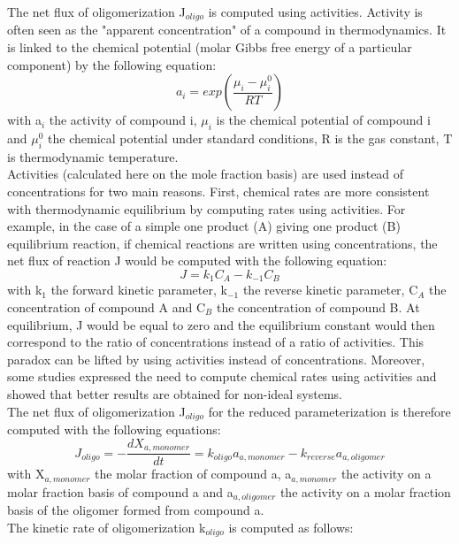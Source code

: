 \documentclass[a4paper,11pt]{article}
\begin{document}
\indent The net flux of oligomerization J$_{oligo}$ is computed using activities. Activity is often seen as the "apparent concentration" of a compound in thermodynamics. It is linked to the chemical potential (molar Gibbs free energy of a particular component) by the following equation:
\begin{equation}
a_i=exp(\frac{\mu_i-\mu_i^0}{RT})
\label{activity}
\end{equation}
with a$_i$ the activity of compound i, $\mu_i$ is the chemical potential of compound i and $\mu_i^0$ the chemical potential under standard conditions, R is the gas constant, T is thermodynamic temperature.\\
Activities (calculated here on the mole fraction basis) are used instead of concentrations for two main reasons. 
First, chemical rates are more consistent with thermodynamic equilibrium by computing rates using activities. For example, in the case of a simple one product (A) giving one product (B) equilibrium reaction, if chemical reactions are written using concentrations, the net flux of reaction J would be computed with the following equation:
\begin{equation}
J=k_{1} C_{A}-k_{-1}C_{B}
\label{AdonneB}
\end{equation}
with k$_{1}$ the forward kinetic parameter, k$_{-1}$ the reverse kinetic parameter, C$_{A}$ the concentration of compound A and C$_{B}$ the concentration of compound B. At equilibrium, 
J would be equal to zero and the equilibrium constant would then correspond to the ratio of concentrations instead of a ratio of activities. 
This paradox can be lifted by using activities instead of concentrations. Moreover, some studies expressed the need to compute chemical rates using activities and showed that better results are obtained for non-ideal systems.\\
\indent The net flux of oligomerization J$_{oligo}$ for the reduced parameterization is therefore computed with the following equations:
\begin{equation}
J_{oligo}=-\frac{dX_{a,monomer}}{dt}=k_{oligo} a_{a,monomer}-k_{reverse}a_{a,oligomer}
\label{oligo_flux}
\end{equation}
with X$_{a,monomer}$ the molar fraction of compound a, a$_{a,monomer}$ the activity on a molar fraction basis of compound a and a$_{a,oligomer}$ the activity on a molar fraction basis of the oligomer formed from compound a.\\
\indent The kinetic rate of oligomerization k$_{oligo}$ is computed as follows:
\end{document}
